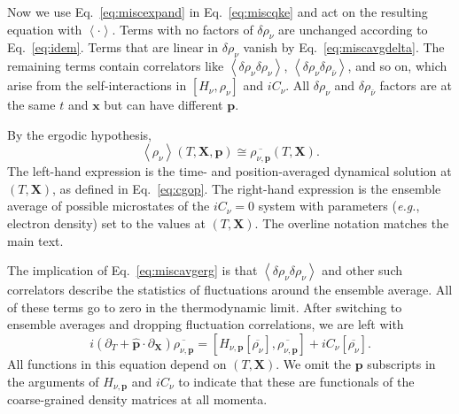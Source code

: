 \documentclass[aps,prd,twocolumn,groupedaddress]{revtex4-2}
\begin{document}
Now we use Eq.~\eqref{eq:miscexpand} in Eq.~\eqref{eq:miscqke} and act on the resulting equation with $\left\langle \cdot \right\rangle$. Terms with no factors of $\delta \rho_\nu$ are unchanged according to Eq.~\eqref{eq:idem}. Terms that are linear in $\delta \rho_\nu$ vanish by Eq.~\eqref{eq:miscavgdelta}. The remaining terms contain correlators like $\left\langle \delta \rho_\nu \delta \rho_\nu \right\rangle$, $\left\langle \delta \rho_\nu \delta \rho_{\bar{\nu}} \right\rangle$, and so on, which arise from the self-interactions in $[ H_\nu, \rho_\nu ]$ and $i C_\nu$. All $\delta \rho_\nu$ and $\delta \rho_{\bar{\nu}}$ factors are at the same $t$ and $\boldsymbol{x}$ but can have different $\boldsymbol{p}$.

By the ergodic hypothesis,
\begin{equation}
\left\langle \rho_\nu \right\rangle (T, \boldsymbol{X}, \boldsymbol{p}) \cong \overline{\rho_{\nu,\boldsymbol{p}}} (T, \boldsymbol{X}). \label{eq:miscavgerg}
\end{equation}
The left-hand expression is the time- and position-averaged dynamical solution at $(T, \boldsymbol{X})$, as defined in Eq.~\eqref{eq:cgop}. The right-hand expression is the ensemble average of possible microstates of the $iC_\nu = 0 $ system with parameters (\textit{e.g.}, electron density) set to the values at $(T, \boldsymbol{X})$. The overline notation matches the main text.

The implication of Eq.~\eqref{eq:miscavgerg} is that $\left\langle \delta \rho_\nu \delta \rho_\nu \right\rangle$ and other such correlators describe the statistics of fluctuations around the ensemble average. All of these terms go to zero in the thermodynamic limit. After switching to ensemble averages and dropping fluctuation correlations, we are left with 
\begin{equation}
i \left( \partial_T + \boldsymbol{\hat{p}} \cdot \partial_{\boldsymbol{X}} \right) \overline{\rho_{\nu,\boldsymbol{p}}} = \left[ H_{\nu,\boldsymbol{p}} \left[ \overline{\rho_\nu} \right], \overline{\rho_{\nu,\boldsymbol{p}}} \right] + iC_\nu \left[ \overline{\rho_\nu} \right].
\end{equation}
All functions in this equation depend on $(T, \boldsymbol{X})$. We omit the $\boldsymbol{p}$ subscripts in the arguments of $H_{\nu,\boldsymbol{p}}$ and $iC_\nu$ to indicate that these are functionals of the coarse-grained density matrices at all momenta.
\end{document}
